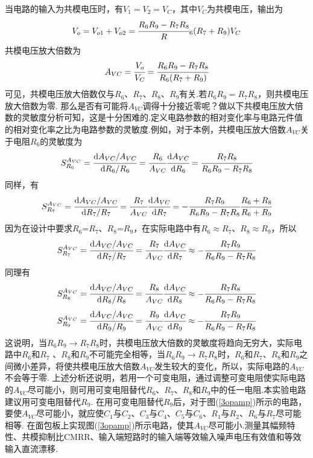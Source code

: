\documentclass[a4paper]{article}
\begin{document}
当电路的输入为共模电压时，有$V_1=V_2=V_C$，其中$V_C$为共模电压，输出为
\begin{equation}
V_o = V_{o1}+V_{o2} = \cfrac{R_6R_9 - R_7R_8}R_6(R_7+R_9){}V_C\label{5.25}
\end{equation}
共模电压放大倍数为
\begin{equation}
A_{VC} = \cfrac{V_o}{V_C} = \cfrac{R_6R_9-R_7R_8}{R_6(R_7+R_9)}\label{5.26}
\end{equation}
可见，共模电压放大倍数仅与$R_6$、$R_7$、$R_8$、$R_9$有关.若$R_6R_9=R_7R_8$，则共模电压放大倍数为零.
那么是否有可能将$A_{VC}$调得十分接近零呢？做以下共模电压放大倍数的灵敏度分析可知，这是十分困难的.定义电路参数的相对变化率与电路元件值的相对变化率之比为电路参数的灵敏度.例如，对于本例，共模电压放大倍数$A_{VC}$关于电阻$R_6$的灵敏度为
\begin{equation}
S_{R_6}^{A_{VC}} = \cfrac{\text{d}A_{VC}/A_{VC}}{\text{d}R_6/R_6} = \cfrac{R_6}{A_{VC}}\cfrac{\text{d}A_{VC}}{\text{d}R_6} = \cfrac{R_7R_8}{R_6R_9 - R_7R_8}\label{5.27}
\end{equation}
同样，有
\begin{equation}
S_{R_7}^{A_{VC}} = \cfrac{\text{d}A_{VC}/A_{VC}}{\text{d}R_7/R_7} = \cfrac{R_7}{A_{VC}}\cfrac{\text{d}A_{VC}}{\text{d}R_7} = -\cfrac{R_7R_9}{R_6R_9 - R_7R_8}\cfrac{R_6+R_8}{R_6+R_9}\label{5.28}
\end{equation}
因为在设计中要求$R_6$=$R_7$、$R_8$=$R_9$，在实际电路中有$R_6\approx R_7$、$R_8\approx R_9$，所以
\begin{equation}
S_{R_7}^{A_{VC}} = \cfrac{\text{d}A_{VC}/A_{VC}}{\text{d}R_7/R_7} = \cfrac{R_7}{A_{VC}}\cfrac{\text{d}A_{VC}}{\text{d}R_7} \approx -\cfrac{R_7R_9}{R_6R_9 - R_7R_8}\label{5.29}
\end{equation}
同理有
\begin{equation}
S_{R_8}^{A_{VC}} = \cfrac{\text{d}A_{VC}/A_{VC}}{\text{d}R_8/R_8} = \cfrac{R_8}{A_{VC}}\cfrac{\text{d}A_{VC}}{\text{d}R_8} \approx -\cfrac{R_7R_8}{R_6R_9 - R_7R_8}\label{5.30}
\end{equation}
\begin{equation}
S_{R_9}^{A_{VC}} = \cfrac{\text{d}A_{VC}/A_{VC}}{\text{d}R_9/R_9} = \cfrac{R_9}{A_{VC}}\cfrac{\text{d}A_{VC}}{\text{d}R_9} \approx -\cfrac{R_7R_9}{R_6R_9 - R_7R_8}\label{5.31}
\end{equation}
这说明，当$R_6R_9\to R_7R_8$时，共模电压放大倍数的灵敏度将趋向无穷大，实际电路中$R_6$和$R_7$ 、$R_8$和$R_9$不可能完全相等，当$R_6R_9\to R_7R_8$时，$R_6$和$R_7$、$R_8$和$R_9$之间微小差异，将使共模电压放大倍数$A_{VC}$发生较大的变化，所以，实际电路的$A_{VC}$不会等于零.
上述分析还说明，若用一个可变电阻，通过调整可变电阻使实际电路的$A_{VC}$尽可能小，则可用可变电阻替代$R_6$、$R_7$、$R_8$和$R_9$中的任一电阻.本实验电路建议用可变电阻替代$R_9$.
在用可变电阻替代$R_9$后，对于图(\ref{3opamp})所示的电路，要使$A_{VC}$尽可能小，就应使$C_1$与$C_2$、$C_3$与$C_4$、$C_5$与$C_6$、$R_1$与$R_2$、$R_6$与$R_7$尽可能相等.
在面包板上实现图(\ref{3opamp})所示电路，使其$A_{VC}$尽可能小.测量其幅频特性、共模抑制比CMRR、输入端短路时的输入端等效输入噪声电压有效值和等效输入直流漂移.
\end{document}
